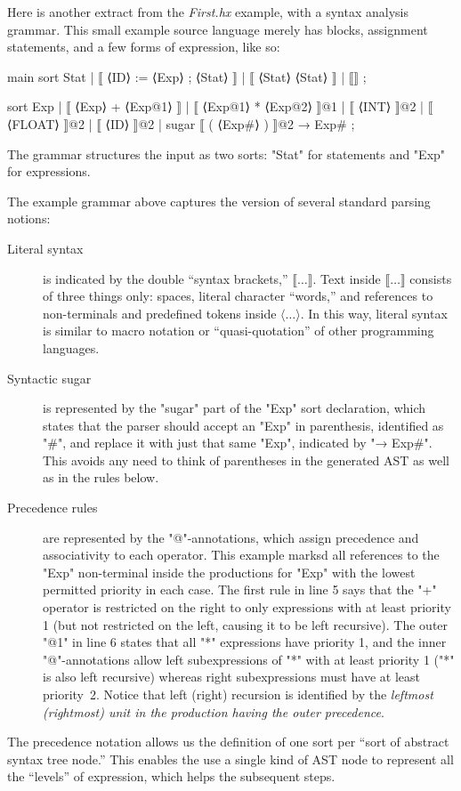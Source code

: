 \documentclass[11pt]{article} %
\begin{document}
\begin{example}\label{ex:syntax}
  Here is another extract from the \emph{First.hx} example, with a syntax analysis grammar. This
  small example source language merely has blocks, assignment statements, and a few forms of
  expression, like so:
  \begin{hacs}[xleftmargin=\parindent,xrightmargin=2em,numbers=right]
main sort Stat  | ⟦ ⟨ID⟩ := ⟨Exp⟩ ; ⟨Stat⟩ ⟧
                | ⟦ { ⟨Stat⟩ } ⟨Stat⟩ ⟧
                | ⟦⟧ ;

sort Exp  | ⟦ ⟨Exp⟩ + ⟨Exp@1⟩ ⟧
           | ⟦ ⟨Exp@1⟩ * ⟨Exp@2⟩ ⟧@1
           | ⟦ ⟨INT⟩ ⟧@2
           | ⟦ ⟨FLOAT⟩ ⟧@2
           | ⟦ ⟨ID⟩ ⟧@2
           | sugar ⟦ ( ⟨Exp#⟩ ) ⟧@2 → Exp# ;
  \end{hacs}
  The grammar structures the input as two sorts: "Stat" for statements and "Exp" for expressions.
\end{example}

The example grammar above captures the \HAX version of several standard parsing notions:
\begin{description}

\item[Literal syntax] is indicated by the double ``syntax brackets,'' $⟦…⟧$.  Text inside $⟦…⟧$
  consists of three things only: spaces, literal character ``words,'' and references to
  non-terminals and predefined tokens inside $⟨…⟩$.  In this way, literal syntax is similar to macro
  notation or ``quasi-quotation'' of other programming languages.

\item[Syntactic sugar] is represented by the "sugar" part of the "Exp" sort declaration, which
  states that the parser should accept an "Exp" in parenthesis, identified as "#", and replace it
  with just that same "Exp", indicated by "→ Exp#".  This avoids any need to think of parentheses in
  the generated AST as well as in the rules below.

\item[Precedence rules] are represented by the "@"-annotations, which assign precedence and
  associativity to each operator. This example marksd all references to the "Exp" non-terminal
  inside the productions for "Exp" with the lowest permitted priority in each case. The first rule
  in line 5 says that the "+" operator is restricted on the right to only expressions with at least
  priority 1 (but not restricted on the left, causing it to be left recursive). The outer "@1" in
  line 6 states that all "*" expressions have priority 1, and the inner "@"-annotations allow left
  subexpressions of "*" with at least priority 1 ("*" is also left recursive) whereas right
  subexpressions must have at least priority~2. Notice that left (right) recursion is identified by
  the \emph{leftmost (rightmost) unit in the production having the outer precedence}.

\end{description}
The precedence notation allows us the definition of one sort per ``sort of abstract syntax tree
node.''  This enables the use a single kind of AST node to represent all the ``levels'' of
expression, which helps the subsequent steps.
\end{document}
